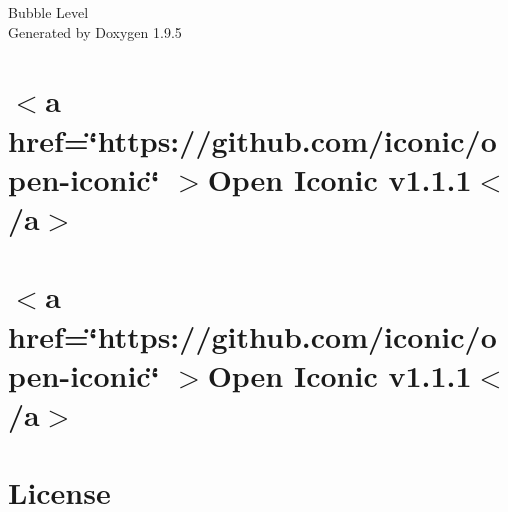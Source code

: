 \documentclass[twoside]{book}
\newcommand{\+}{\discretionary{\mbox{\scriptsize$\hookleftarrow$}}{}{}}
\newcommand{\clearemptydoublepage}{%
    \newpage{\pagestyle{empty}\cleardoublepage}%
  }
\begin{document}
  \raggedbottom
    \hypersetup{pageanchor=false,
                bookmarksnumbered=true,
                pdfencoding=unicode
               }
  \begin{titlepage}
  \vspace*{7cm}
  \begin{center}%
  {\Large Bubble Level}\\
  \vspace*{1cm}
  {\large Generated by Doxygen 1.9.5}\\
  \end{center}
  \end{titlepage}
  \clearemptydoublepage
  \tableofcontents
  \clearemptydoublepage
  \hypersetup{pageanchor=true}
\chapter{\texorpdfstring{$<$}{<}a href=\char`\"{}https\+://github.\+com/iconic/open-\/iconic\char`\"{} \texorpdfstring{$>$}{>}Open Iconic v1.1.1\texorpdfstring{$<$}{<}/a\texorpdfstring{$>$}{>}}
\label{md_levelserver_bin__debug_net7_0_publish_wwwroot_css_open_iconic__r_e_a_d_m_e}

\chapter{\texorpdfstring{$<$}{<}a href=\char`\"{}https\+://github.\+com/iconic/open-\/iconic\char`\"{} \texorpdfstring{$>$}{>}Open Iconic v1.1.1\texorpdfstring{$<$}{<}/a\texorpdfstring{$>$}{>}}
\label{md_levelserver_wwwroot_css_open_iconic__r_e_a_d_m_e}

\chapter{License}
\label{md_nucleo_l432c_piezo_beeper__switch_buzz__drivers__c_m_s_i_s__device__s_t__s_t_m32_l4xx__license}

\end{document}
